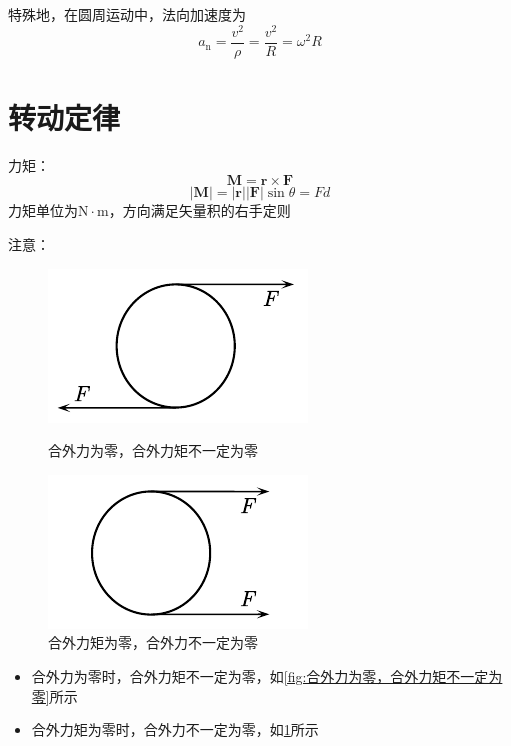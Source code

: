 \documentclass[12pt, a4paper, twoside]{ctexbook}
\begin{document}
特殊地，在圆周运动中，法向加速度为
$$
a_\mathrm{n}=\frac{v^2}{\rho}=\frac{v^2}{R}=\omega^2R
$$
\section{转动定律}
{\sonti 力矩}：
$$
\boldsymbol{M}=\boldsymbol{r}\times\boldsymbol{F}
$$
$$
\left|\boldsymbol{M}\right|=\left|\boldsymbol{r}\right|\left|\boldsymbol{F}\right|\sin\theta=Fd
$$
力矩单位为$\mathrm{N}\cdot\mathrm{m}$，方向满足矢量积的右手定则

{\sonti 注意}：
\begin{figure}[H]
    \centering
    \begin{minipage}{0.48\linewidth}
        \centering
        \includegraphics[width=0.6\linewidth]{合外力为零，合外力矩不一定为零.pdf}
        \caption{合外力为零，合外力矩不一定为零}
        \label{fig:合外力为零，合外力矩不一定为零}
    \end{minipage}
    \begin{minipage}{0.48\linewidth}
        \centering
        \includegraphics[width=0.6\linewidth]{合外力矩为零，合外力不一定为零.pdf}
        \caption{合外力矩为零，合外力不一定为零}
        \label{fig:合外力矩为零，合外力不一定为零}
    \end{minipage}
\end{figure}
\begin{itemize}
    \item 合外力为零时，合外力矩不一定为零，如\textcolor{blue}{\cref{fig:合外力为零，合外力矩不一定为零}}所示
    \item 合外力矩为零时，合外力不一定为零，如\textcolor{blue}{\cref{fig:合外力矩为零，合外力不一定为零}}所示
\end{itemize}
\end{document}
